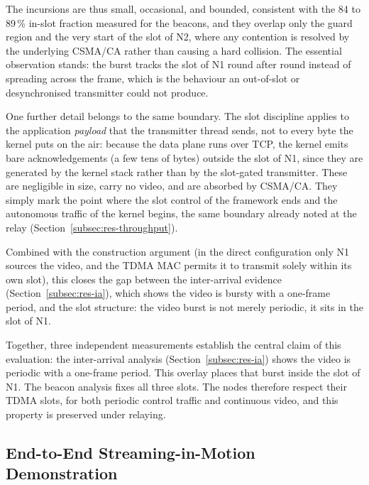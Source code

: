 The incursions are thus small, occasional, and bounded, consistent with the
84 to 89\,\% in-slot fraction measured for the beacons, and they overlap only
the guard region and the very start of the slot of N2, where any contention is
resolved by the underlying CSMA/CA rather than causing a hard collision. The
essential observation stands: the burst tracks the slot of N1 round after round
instead of spreading across the frame, which is the behaviour an out-of-slot or
desynchronised transmitter could not produce.

One further detail belongs to the same boundary. The slot discipline applies to
the application \emph{payload} that the transmitter thread sends, not to every
byte the kernel puts on the air: because the data plane runs over TCP, the
kernel emits bare acknowledgements (a few tens of bytes) outside the slot of N1,
since they are generated by the kernel stack rather than by the slot-gated
transmitter. These are negligible in size, carry no video, and are absorbed by
CSMA/CA. They simply mark the point where the slot control of the framework ends and
the autonomous traffic of the kernel begins, the same boundary already noted at the
relay (Section~\ref{subsec:res-throughput}).

Combined with the construction argument (in the direct configuration only N1
sources the video, and the TDMA MAC permits it to transmit solely within its own
slot), this closes the gap between the inter-arrival evidence
(Section~\ref{subsec:res-ia}), which shows the video is bursty with a one-frame
period, and the slot structure: the video burst is not merely periodic, it sits
in the slot of N1.

Together, three independent measurements establish the central claim of this
evaluation: the inter-arrival analysis (Section~\ref{subsec:res-ia}) shows the
video is periodic with a one-frame period. This overlay places that burst inside
the slot of N1. The beacon analysis fixes all three slots. The nodes therefore
respect their TDMA slots, for both periodic control traffic and continuous video,
and this property is preserved under relaying.

\subsection{End-to-End Streaming-in-Motion Demonstration}
\label{subsec:res-demo}

